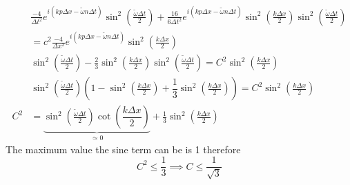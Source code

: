 \documentclass[a4paper,english, 10pt, twoside]{article}
\begin{document}
\begin{align*}
 &\frac{-4}{\Delta t^2}e^{i(kp\Delta x - \tilde\omega n\Delta t)}\sin^2\left(\frac{\tilde\omega\Delta t}{2}\right) + 
 \frac{16}{6\Delta t^2}e^{i(kp\Delta x - \tilde\omega n\Delta t)}\sin^2\left(\frac{k\Delta x}{2}\right)
 \sin^2\left(\frac{\tilde\omega\Delta t}{2}\right) \\
 &= c^2\frac{-4}{\Delta x^2}e^{i(kp\Delta x - \tilde\omega n\Delta t)}\sin^2\left(\frac{k\Delta x}{2}\right)\\
 &\sin^2\left(\frac{\tilde\omega\Delta t}{2}\right) - \frac{2}{3}\sin^2\left(\frac{k\Delta x}{2}\right)
 \sin^2\left(\frac{\tilde\omega\Delta t}{2}\right) = C^2\sin^2\left(\frac{k\Delta x}{2}\right) \\
 &\sin^2\left(\frac{\tilde\omega\Delta t}{2}\right)\left(1-\sin^2\left(\frac{k\Delta x}{2}\right) +\dfrac{1}{3}\sin^2\left(\frac{k\Delta x}{2}\right)\right)
 = C^2\sin^2\left(\frac{k\Delta x}{2}\right) \\
 C^2 &= \underbrace{\sin^2\left(\frac{\tilde\omega\Delta t}{2}\right)\cot\left(\dfrac{k\Delta x}{2}\right)}_{\simeq 0} + 
 \frac{1}{3}\sin^2\left(\frac{k\Delta x}{2}\right)
\end{align*}
The maximum value the sine term can be is 1 therefore 
\begin{equation*}
 C^2 \leq \frac{1}{3} \implies C \leq \frac{1}{\sqrt{3}}
\end{equation*}
\end{document}
